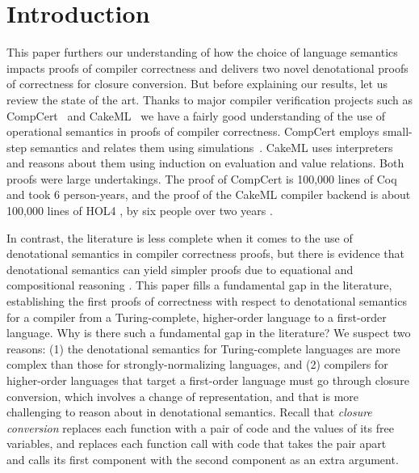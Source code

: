 
\section{Introduction}
\label{sec:intro}

This paper furthers our understanding of how the choice of language
semantics impacts proofs of compiler correctness and delivers two
novel denotational proofs of correctness for closure conversion. But
before explaining our results, let us review the state of the
art. Thanks to major compiler verification projects such as
CompCert~\citep{Leroy:2009aa} and
CakeML~\citep{Kumar:2014aa,Owens:2016aa} we have a fairly good
understanding of the use of operational semantics in proofs of
compiler correctness. CompCert employs small-step semantics and
relates them using simulations~\citep{Leroy:2016aa}. CakeML uses
interpreters and reasons about them using induction on evaluation and
value relations.  Both proofs were large undertakings. The proof of
CompCert is 100,000 lines of Coq and took 6 person-years, and the
proof of the CakeML compiler backend is about 100,000 lines of HOL4
\citep{Tan:2019aa}, by six people over two years
\citep{Myreen:2016aa}.

In contrast, the literature is less complete when it comes to the use
of denotational semantics in compiler correctness proofs, but there is
evidence that denotational semantics can yield simpler proofs due to
equational and compositional reasoning
\citep{Morris:1973ab,Stoy:1977aa,Zakowski:2021aa}. This
paper fills a fundamental gap in the literature, establishing the
first proofs of correctness with respect to denotational semantics
for a compiler from a Turing-complete, higher-order language to a
first-order language. Why is there such a fundamental gap in the
literature? We suspect two reasons: (1) the denotational semantics for
Turing-complete languages are more complex than those for
strongly-normalizing languages, and (2) compilers for higher-order
languages that target a first-order language must go through closure
conversion, which involves a change of representation, and that is
more challenging to reason about in denotational semantics. Recall
that \emph{closure conversion} replaces each function with a pair of
code and the values of its free variables, and replaces each function
call with code that takes the pair
apart~\citep{Guy-L.-Steele:1978yq,Cardelli:1984aa} and calls
its first component with the second component as an extra argument.

